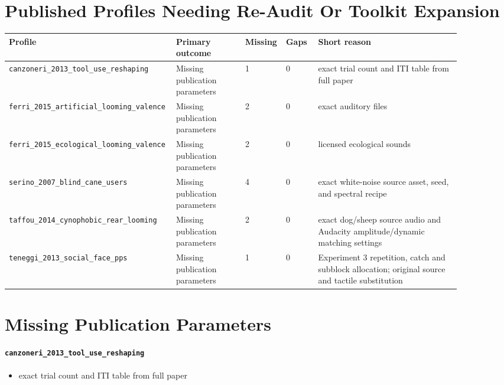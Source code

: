 \documentclass[11pt]{article}
\begin{document}
\section*{Published Profiles Needing Re-Audit Or Toolkit Expansion}
{\footnotesize
\begin{longtable}{>{\raggedright\arraybackslash}p{0.29\linewidth}p{0.15\linewidth}p{0.07\linewidth}p{0.07\linewidth}>{\raggedright\arraybackslash}p{0.31\linewidth}}
\toprule
Profile & Primary outcome & Missing & Gaps & Short reason \\
\midrule
\endhead
\texttt{canzoneri\_\allowbreak{}2013\_\allowbreak{}tool\_\allowbreak{}use\_\allowbreak{}reshaping} & Missing publication parameters & 1 & 0 & exact trial count and ITI table from full paper \\
\texttt{ferri\_\allowbreak{}2015\_\allowbreak{}artificial\_\allowbreak{}looming\_\allowbreak{}valence} & Missing publication parameters & 2 & 0 & exact auditory files \\
\texttt{ferri\_\allowbreak{}2015\_\allowbreak{}ecological\_\allowbreak{}looming\_\allowbreak{}valence} & Missing publication parameters & 2 & 0 & licensed ecological sounds \\
\texttt{serino\_\allowbreak{}2007\_\allowbreak{}blind\_\allowbreak{}cane\_\allowbreak{}users} & Missing publication parameters & 4 & 0 & exact white-noise source asset, seed, and spectral recipe \\
\texttt{taffou\_\allowbreak{}2014\_\allowbreak{}cynophobic\_\allowbreak{}rear\_\allowbreak{}looming} & Missing publication parameters & 2 & 0 & exact dog/sheep source audio and Audacity amplitude/dynamic matching settings \\
\texttt{teneggi\_\allowbreak{}2013\_\allowbreak{}social\_\allowbreak{}face\_\allowbreak{}pps} & Missing publication parameters & 1 & 0 & Experiment 3 repetition, catch and subblock allocation; original source and tactile substitution \\
\bottomrule
\end{longtable}
}

\section*{Missing Publication Parameters}
\paragraph{\texttt{canzoneri\_\allowbreak{}2013\_\allowbreak{}tool\_\allowbreak{}use\_\allowbreak{}reshaping}}
\begin{itemize}
\item exact trial count and ITI table from full paper
\end{itemize}
\end{document}

